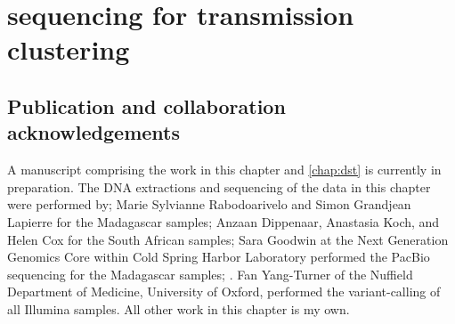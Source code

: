 
\chapter{\ont{} sequencing for \mtb{} transmission clustering}
\label{chap:clustering}

\ifpdf
    \graphicspath{{Chapter2/Figs/Raster/}{Chapter2/Figs/PDF/}{Chapter2/Figs/}}
\else
    \graphicspath{{Chapter2/Figs/Vector/}{Chapter2/Figs/}}
\fi


\setcounter{section}{-1}
\section{Publication and collaboration acknowledgements}
\label{sec:ch2-acknowledge}

A manuscript comprising the work in this chapter and \autoref{chap:dst} is currently in preparation. The DNA extractions and sequencing of the data in this chapter were performed by; Marie Sylvianne Rabodoarivelo and Simon Grandjean Lapierre for the Madagascar samples; Anzaan Dippenaar, Anastasia Koch, and Helen Cox for the South African samples; Sara Goodwin at the Next Generation Genomics Core within Cold Spring Harbor Laboratory performed the PacBio sequencing for the Madagascar samples; . Fan Yang-Turner of the Nuffield Department of Medicine, University of Oxford, performed the variant-calling of all Illumina samples. All other work in this chapter is my own.


